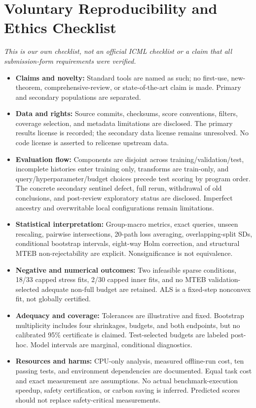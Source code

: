 \documentclass{article}
\begin{document}
\section{Voluntary Reproducibility and Ethics Checklist}
\label{app:checklist}
\textit{This is our own checklist, not an official ICML checklist or a claim that all submission-form requirements were verified.}
\begin{itemize}
 \item \textbf{Claims and novelty:} Standard tools are named as such; no first-use, new-theorem, comprehensive-review, or state-of-the-art claim is made. Primary and secondary populations are separated.
 \item \textbf{Data and rights:} Source commits, checksums, score conventions, filters, coverage selection, and metadata limitations are disclosed. The primary results license is recorded; the secondary data license remains unresolved. No code license is asserted to relicense upstream data.
 \item \textbf{Evaluation flow:} Components are disjoint across training/validation/test, incomplete histories enter training only, transforms are train-only, and query/hyperparameter/budget choices precede test scoring by program order. The concrete secondary sentinel defect, full rerun, withdrawal of old conclusions, and post-review exploratory status are disclosed. Imperfect ancestry and overwritable local configurations remain limitations.
 \item \textbf{Statistical interpretation:} Group-macro metrics, exact queries, unseen rescaling, pairwise intersections, 20-path loss averaging, overlapping-split SDs, conditional bootstrap intervals, eight-way Holm correction, and structural MTEB non-rejectability are explicit. Nonsignificance is not equivalence.
 \item \textbf{Negative and numerical outcomes:} Two infeasible sparse conditions, 18/33 capped stress fits, 2/30 capped inner fits, and no MTEB validation-selected adequate non-full budget are retained. ALS is a fixed-step nonconvex fit, not globally certified.
 \item \textbf{Adequacy and coverage:} Tolerances are illustrative and fixed. Bootstrap multiplicity includes four shrinkages, budgets, and both endpoints, but no calibrated 95\% certificate is claimed. Test-selected budgets are labeled post-hoc. Model intervals are marginal, conditional diagnostics.
 \item \textbf{Resources and harms:} CPU-only analysis, measured offline-run cost, ten passing tests, and environment dependencies are documented. Equal task cost and exact measurement are assumptions. No actual benchmark-execution speedup, safety certification, or carbon saving is inferred. Predicted scores should not replace safety-critical measurements.

\end{itemize}
\end{document}
